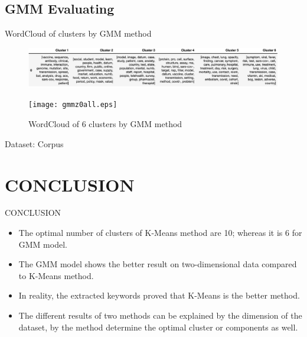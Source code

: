 \documentclass[9pt]{beamer}
\begin{document}
\subsection{GMM Evaluating}
\begin{frame}{WordCloud of clusters by GMM method}
\begin{figure}[!t]
  \centering
  \begin{minipage}[b]{1\textwidth}
    \includegraphics[width=1\columnwidth]{gmm_keywords.eps}
    \caption{Keywords of 6 clusters by GMM method.}
  \end{minipage}
  \hfill
  \begin{minipage}[b]{0.7\textwidth}
    \texttt{[image: gmmz0all.eps]}
    \caption{WordCloud of 6 clusters by GMM method\label{nqa}}
  \end{minipage}
\end{figure}
    \item Dataset: Corpus
\end{frame}
\section{CONCLUSION}
\begin{frame}{CONCLUSION}
\begin{itemize}

  \setlength\itemsep{1em}  %
  
    \item The optimal number of clusters of K-Means method are 10; whereas it is 6 for GMM model.
    
    \item The GMM model shows the better result on two-dimensional data compared to K-Means method.
    
    \item In reality, the extracted keywords proved that K-Means is the better method.
    
    \item The different results of two methods can be explained by the dimension of the dataset, by the method determine the optimal cluster or components as well.
    
\end{itemize}
\end{frame}
\end{document}
